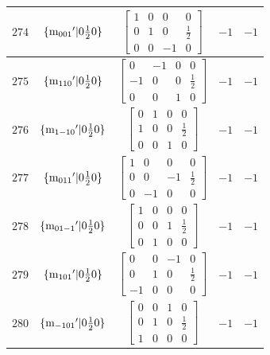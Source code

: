 \documentclass[fleqn,8pt]{jsarticle}
\begin{document}
\begin{longtable}{ccccc}
$ 274 $ & $ \{{\rm m}_{001}{}'|0 \frac{1}{2} 0\} $ & $ \begin{bmatrix} 1 & 0 & 0 & 0 \\ 0 & 1 & 0 & \frac{1}{2} \\ 0 & 0 & -1 & 0 \end{bmatrix} $ & $ -1 $ & $ -1 $ \\ \hline
$ 275 $ & $ \{{\rm m}_{110}{}'|0 \frac{1}{2} 0\} $ & $ \begin{bmatrix} 0 & -1 & 0 & 0 \\ -1 & 0 & 0 & \frac{1}{2} \\ 0 & 0 & 1 & 0 \end{bmatrix} $ & $ -1 $ & $ -1 $ \\ \hline
$ 276 $ & $ \{{\rm m}_{1-10}{}'|0 \frac{1}{2} 0\} $ & $ \begin{bmatrix} 0 & 1 & 0 & 0 \\ 1 & 0 & 0 & \frac{1}{2} \\ 0 & 0 & 1 & 0 \end{bmatrix} $ & $ -1 $ & $ -1 $ \\ \hline
$ 277 $ & $ \{{\rm m}_{011}{}'|0 \frac{1}{2} 0\} $ & $ \begin{bmatrix} 1 & 0 & 0 & 0 \\ 0 & 0 & -1 & \frac{1}{2} \\ 0 & -1 & 0 & 0 \end{bmatrix} $ & $ -1 $ & $ -1 $ \\ \hline
$ 278 $ & $ \{{\rm m}_{01-1}{}'|0 \frac{1}{2} 0\} $ & $ \begin{bmatrix} 1 & 0 & 0 & 0 \\ 0 & 0 & 1 & \frac{1}{2} \\ 0 & 1 & 0 & 0 \end{bmatrix} $ & $ -1 $ & $ -1 $ \\ \hline
$ 279 $ & $ \{{\rm m}_{101}{}'|0 \frac{1}{2} 0\} $ & $ \begin{bmatrix} 0 & 0 & -1 & 0 \\ 0 & 1 & 0 & \frac{1}{2} \\ -1 & 0 & 0 & 0 \end{bmatrix} $ & $ -1 $ & $ -1 $ \\ \hline
$ 280 $ & $ \{{\rm m}_{-101}{}'|0 \frac{1}{2} 0\} $ & $ \begin{bmatrix} 0 & 0 & 1 & 0 \\ 0 & 1 & 0 & \frac{1}{2} \\ 1 & 0 & 0 & 0 \end{bmatrix} $ & $ -1 $ & $ -1 $ \\ \hline

\end{longtable}
\end{document}
